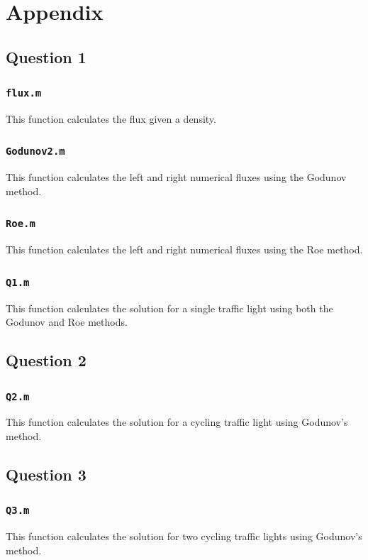 \documentclass[10pt]{article}
\begin{document}
\section{Appendix}
\subsection{Question 1}
\subsubsection{{\tt flux.m}}
This function calculates the flux given a density.

\subsubsection{{\tt Godunov2.m}}
This function calculates the left and right numerical fluxes using the Godunov method.

\subsubsection{{\tt Roe.m}}
This function calculates the left and right numerical fluxes using the Roe method.

\subsubsection{{\tt Q1.m}}
This function calculates the solution for a single traffic light using both the Godunov and Roe methods.


\subsection{Question 2}
\subsubsection{{\tt Q2.m}}
This function calculates the solution for a cycling traffic light using Godunov's method.


\subsection{Question 3}
\subsubsection{{\tt Q3.m}}
This function calculates the solution for two cycling traffic lights using Godunov's method.

\end{document}
